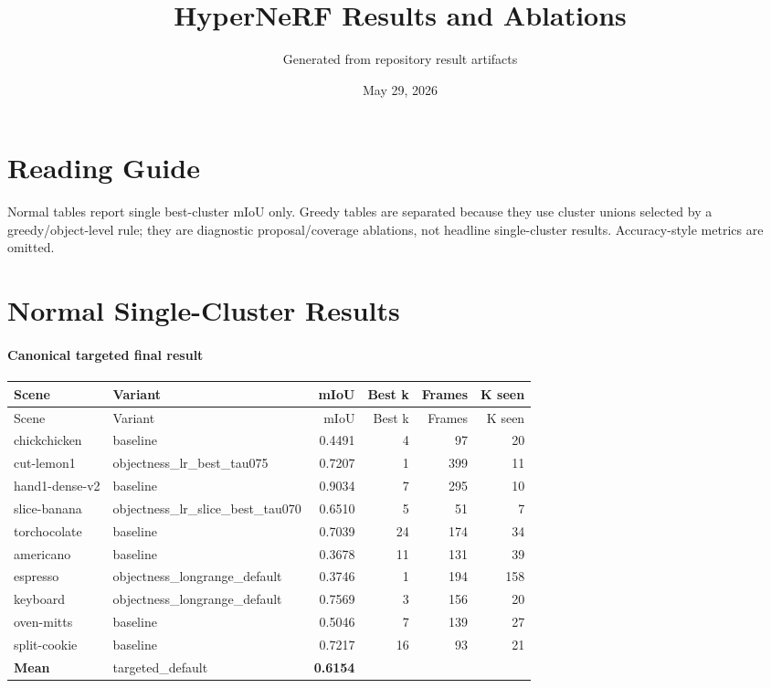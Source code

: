 \documentclass[10pt]{article}
\begin{document}
\title{HyperNeRF Results and Ablations}
\author{Generated from repository result artifacts}
\date{May 29, 2026}
\maketitle

\section{Reading Guide}
Normal tables report single best-cluster mIoU only.  Greedy tables are separated because they use cluster unions selected by a greedy/object-level rule; they are diagnostic proposal/coverage ablations, not headline single-cluster results.  Accuracy-style metrics are omitted.

\section{Normal Single-Cluster Results}
\paragraph{Canonical targeted final result}
\small
\begin{longtable}{llrrrr}
\toprule
Scene & Variant & mIoU & Best k & Frames & K seen \\
\midrule
\endfirsthead
\toprule
Scene & Variant & mIoU & Best k & Frames & K seen \\
\midrule
\endhead
chickchicken & baseline & 0.4491 & 4 & 97 & 20 \\
cut-lemon1 & objectness\_lr\_best\_tau075 & 0.7207 & 1 & 399 & 11 \\
hand1-dense-v2 & baseline & 0.9034 & 7 & 295 & 10 \\
slice-banana & objectness\_lr\_slice\_best\_tau070 & 0.6510 & 5 & 51 & 7 \\
torchocolate & baseline & 0.7039 & 24 & 174 & 34 \\
americano & baseline & 0.3678 & 11 & 131 & 39 \\
espresso & objectness\_longrange\_default & 0.3746 & 1 & 194 & 158 \\
keyboard & objectness\_longrange\_default & 0.7569 & 3 & 156 & 20 \\
oven-mitts & baseline & 0.5046 & 7 & 139 & 27 \\
split-cookie & baseline & 0.7217 & 16 & 93 & 21 \\
\midrule
\textbf{Mean} & targeted\_default & \textbf{0.6154} &  &  &  \\
\bottomrule
\end{longtable}
\normalsize
\end{document}
